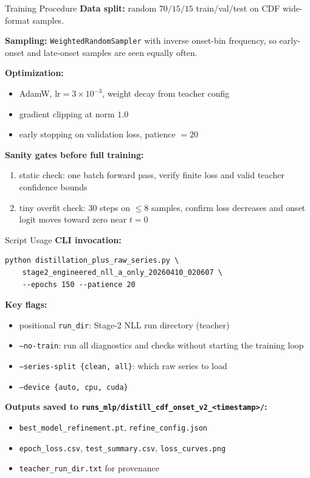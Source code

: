 \documentclass[UTF8,aspectratio=169]{ctexbeamer}
\begin{document}
\begin{frame}{Training Procedure}
\textbf{Data split:} random $70/15/15$ train/val/test on CDF wide-format samples.

\vspace{0.3em}
\textbf{Sampling:} \texttt{WeightedRandomSampler} with inverse onset-bin frequency, so early-onset and late-onset samples are seen equally often.

\vspace{0.3em}
\textbf{Optimization:}
\begin{itemize}
  \item AdamW, $\mathrm{lr}=3\times10^{-3}$, weight decay from teacher config
  \item gradient clipping at norm $1.0$
  \item early stopping on validation loss, patience $=20$
\end{itemize}

\vspace{0.3em}
\textbf{Sanity gates before full training:}
\begin{enumerate}
  \item static check: one batch forward pass, verify finite loss and valid teacher confidence bounds
  \item tiny overfit check: 30 steps on $\leq8$ samples, confirm loss decreases and onset logit moves toward zero near $t=0$
\end{enumerate}
\end{frame}

\begin{frame}{Script Usage}
\textbf{CLI invocation:}
\begin{verbatim}
python distillation_plus_raw_series.py \
    stage2_engineered_nll_a_only_20260410_020607 \
    --epochs 150 --patience 20
\end{verbatim}

\vspace{0.3em}
\textbf{Key flags:}
\begin{itemize}
  \item positional \texttt{run\_dir}: Stage-2 NLL run directory (teacher)
  \item \texttt{--no-train}: run all diagnostics and checks without starting the training loop
  \item \texttt{--series-split \{clean, all\}}: which raw series to load
  \item \texttt{--device \{auto, cpu, cuda\}}
\end{itemize}

\vspace{0.3em}
\textbf{Outputs saved to \texttt{runs\_mlp/distill\_cdf\_onset\_v2\_<timestamp>/}:}
\begin{itemize}
  \item \texttt{best\_model\_refinement.pt}, \texttt{refine\_config.json}
  \item \texttt{epoch\_loss.csv}, \texttt{test\_summary.csv}, \texttt{loss\_curves.png}
  \item \texttt{teacher\_run\_dir.txt} for provenance
\end{itemize}
\end{frame}
\end{document}
